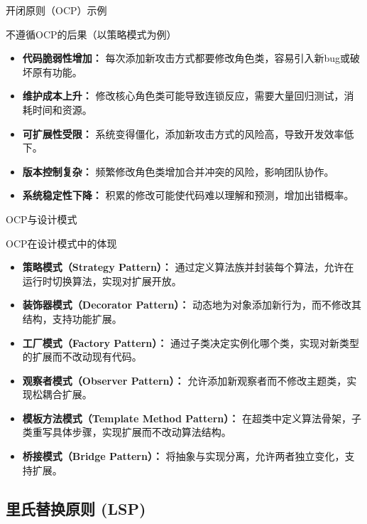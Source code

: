 \documentclass[UTF8,aspectratio=169]{beamer}
\begin{document}
\begin{frame}{开闭原则（OCP）示例}
    \begin{alertytublock}{不遵循OCP的后果（以策略模式为例）}
        \begin{itemize}
            \item \textbf{代码脆弱性增加：} 每次添加新攻击方式都要修改角色类，容易引入新bug或破坏原有功能。
            \item \textbf{维护成本上升：} 修改核心角色类可能导致连锁反应，需要大量回归测试，消耗时间和资源。
            \item \textbf{可扩展性受限：} 系统变得僵化，添加新攻击方式的风险高，导致开发效率低下。
            \item \textbf{版本控制复杂：} 频繁修改角色类增加合并冲突的风险，影响团队协作。
            \item \textbf{系统稳定性下降：} 积累的修改可能使代码难以理解和预测，增加出错概率。
        \end{itemize}
    \end{alertytublock}
\end{frame}

\begin{frame}{OCP与设计模式}
    \begin{ytublock}{OCP在设计模式中的体现}
        \begin{itemize}
            \item \textbf{策略模式（Strategy Pattern）：} 通过定义算法族并封装每个算法，允许在运行时切换算法，实现对扩展开放。
            \item \textbf{装饰器模式（Decorator Pattern）：} 动态地为对象添加新行为，而不修改其结构，支持功能扩展。
            \item \textbf{工厂模式（Factory Pattern）：} 通过子类决定实例化哪个类，实现对新类型的扩展而不改动现有代码。
            \item \textbf{观察者模式（Observer Pattern）：} 允许添加新观察者而不修改主题类，实现松耦合扩展。
            \item \textbf{模板方法模式（Template Method Pattern）：} 在超类中定义算法骨架，子类重写具体步骤，实现扩展而不改动算法结构。
            \item \textbf{桥接模式（Bridge Pattern）：} 将抽象与实现分离，允许两者独立变化，支持扩展。
        \end{itemize}
    \end{ytublock}
\end{frame}

\subsection{里氏替换原则 (LSP)}
\end{document}
